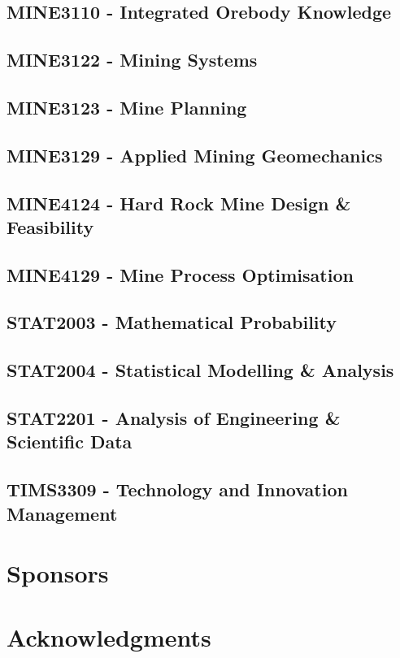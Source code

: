 \documentclass[a4paper,12pt]{report}
\begin{document}
\hypertarget{MINE3110}{\section{MINE3110 - Integrated Orebody Knowledge}}

\hypertarget{MINE3122}{\section{MINE3122 - Mining Systems}}

\hypertarget{MINE3123}{\section{MINE3123 - Mine Planning}}

\hypertarget{MINE3129}{\section{MINE3129 - Applied Mining Geomechanics}}

\hypertarget{MINE4124}{\section{MINE4124 - Hard Rock Mine Design \& Feasibility}}

\hypertarget{MINE4129}{\section{MINE4129 - Mine Process Optimisation}}

\hypertarget{STAT2003}{\section{STAT2003 - Mathematical Probability}}

\hypertarget{STAT2004}{\section{STAT2004 - Statistical Modelling \& Analysis}}

\hypertarget{STAT2201}{\section{STAT2201 - Analysis of Engineering \& Scientific Data}}

\hypertarget{TIMS3309}{\section{TIMS3309 - Technology and Innovation Management}}



\chapter{Sponsors}

\chapter{Acknowledgments}
\end{document}

